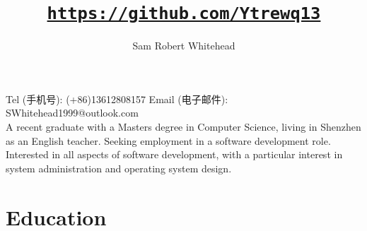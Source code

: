 



\title{\href{https://github.com/Ytrewq13}{\texttt{https://github.com/Ytrewq13}}}
\author{Sam Robert Whitehead}

\maketitle

\pagestyle{empty}
\thispagestyle{empty}

Tel (手机号): (+86)13612808157 \hfill
Email (电子邮件): SWhitehead1999@outlook.com\\
\vspace{1mm}
A recent graduate with a Masters degree in Computer Science, living in Shenzhen
as an English teacher. Seeking employment in a software development role.
Interested in all aspects of software development, with a particular interest
in system administration and operating system design.

\section{Education}
